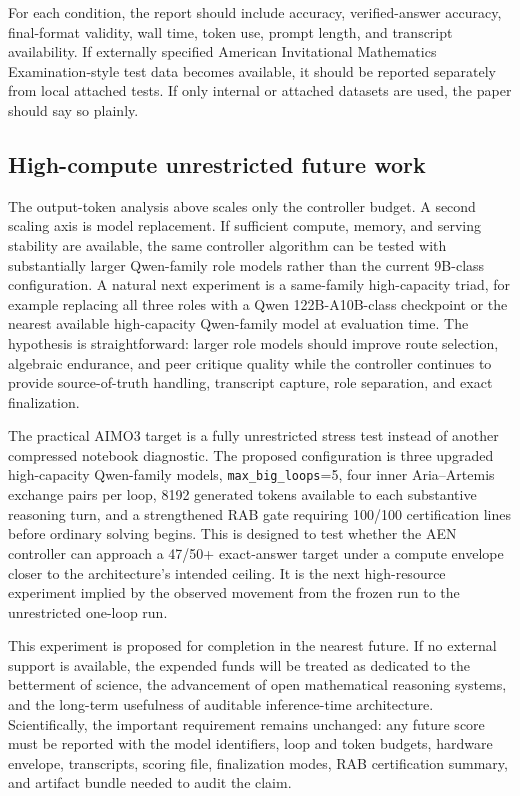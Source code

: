 \documentclass[11pt]{article}
\newcommand{\rab}{RAB}
\begin{document}
For each condition, the report should include accuracy, verified-answer accuracy, final-format validity, wall time, token use, prompt length, and transcript availability. If externally specified American Invitational Mathematics Examination-style test data becomes available, it should be reported separately from local attached tests. If only internal or attached datasets are used, the paper should say so plainly.

\subsection{High-compute unrestricted future work}

The output-token analysis above scales only the controller budget. A second scaling axis is model replacement. If sufficient compute, memory, and serving stability are available, the same controller algorithm can be tested with substantially larger Qwen-family role models rather than the current 9B-class configuration. A natural next experiment is a same-family high-capacity triad, for example replacing all three roles with a Qwen 122B-A10B-class checkpoint or the nearest available high-capacity Qwen-family model at evaluation time. The hypothesis is straightforward: larger role models should improve route selection, algebraic endurance, and peer critique quality while the controller continues to provide source-of-truth handling, transcript capture, role separation, and exact finalization.

The practical AIMO3 target is a fully unrestricted stress test instead of another compressed notebook diagnostic. The proposed configuration is three upgraded high-capacity Qwen-family models, \texttt{max\_big\_loops}=5, four inner Aria--Artemis exchange pairs per loop, 8192 generated tokens available to each substantive reasoning turn, and a strengthened \rab{} gate requiring 100/100 certification lines before ordinary solving begins. This is designed to test whether the AEN controller can approach a 47/50+ exact-answer target under a compute envelope closer to the architecture's intended ceiling. It is the next high-resource experiment implied by the observed movement from the frozen run to the unrestricted one-loop run.

This experiment is proposed for completion in the nearest future. If no external support is available, the expended funds will be treated as dedicated to the betterment of science, the advancement of open mathematical reasoning systems, and the long-term usefulness of auditable inference-time architecture. Scientifically, the important requirement remains unchanged: any future score must be reported with the model identifiers, loop and token budgets, hardware envelope, transcripts, scoring file, finalization modes, \rab{} certification summary, and artifact bundle needed to audit the claim.
\end{document}
